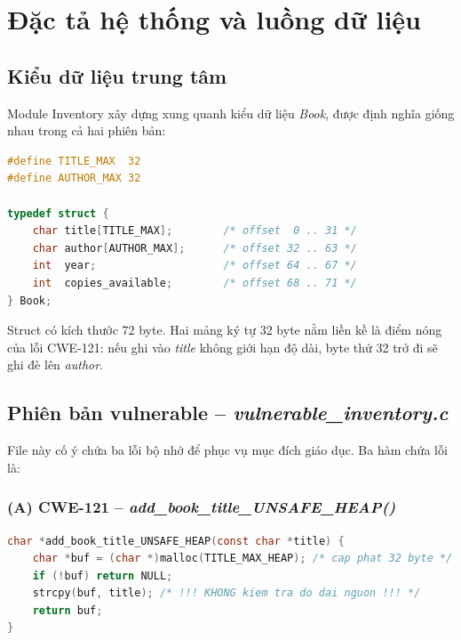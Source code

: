 
\section{Đặc tả hệ thống và luồng dữ liệu}
\label{sec:dacta}

\subsection{Kiểu dữ liệu trung tâm}

Module Inventory xây dựng xung quanh kiểu dữ liệu \textit{Book}, được định nghĩa
giống nhau trong cả hai phiên bản:

\begin{lstlisting}[language=C, caption={Định nghĩa struct Book}]
#define TITLE_MAX  32
#define AUTHOR_MAX 32

typedef struct {
    char title[TITLE_MAX];        /* offset  0 .. 31 */
    char author[AUTHOR_MAX];      /* offset 32 .. 63 */
    int  year;                    /* offset 64 .. 67 */
    int  copies_available;        /* offset 68 .. 71 */
} Book;
\end{lstlisting}

Struct có kích thước 72 byte. Hai mảng ký tự 32 byte nằm liền kề là điểm nóng
của lỗi CWE-121: nếu ghi vào \textit{title} không giới hạn độ dài, byte thứ 32
trở đi sẽ ghi đè lên \textit{author}.

\subsection{Phiên bản vulnerable -- \textit{vulnerable\_inventory.c}}

File này cố ý chứa ba lỗi bộ nhớ để phục vụ mục đích giáo dục. Ba hàm chứa lỗi
là:

\subsubsection{(A) CWE-121 -- \textit{add\_book\_title\_UNSAFE\_HEAP()}}

\begin{lstlisting}[language=C, caption={Lỗi CWE-121: strcpy không giới hạn độ dài (heap variant)}]
char *add_book_title_UNSAFE_HEAP(const char *title) {
    char *buf = (char *)malloc(TITLE_MAX_HEAP); /* cap phat 32 byte */
    if (!buf) return NULL;
    strcpy(buf, title); /* !!! KHONG kiem tra do dai nguon !!! */
    return buf;
}
\end{lstlisting}

